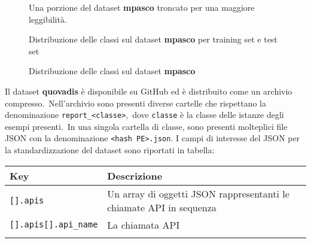 \begin{figure}[h!]
    \centering
    \inputminted[fontsize=\small]{text}{validazione-empirica/files/mpasco-example.csv}
    \caption{Una porzione del dataset \textbf{mpasco} troncato per una maggiore leggibilità.}
    \label{fig:mpasco-example}
\end{figure}


\begin{figure}[h!]
    \centering
    \caption{Distribuzione delle classi sul dataset \textbf{mpasco} per training set e test set}
    \label{fig:mpasco-classes-sets}
\end{figure}

\begin{figure}[h!]
    \centering
    \caption{Distribuzione delle classi sul dataset \textbf{mpasco}}
    \label{fig:mpasco-classes}
\end{figure}

\FloatBarrier


Il dataset \textbf{quovadis} è disponibile su GitHub ed è distribuito come un archivio compresso.\
Nell'archivio sono presenti diverse cartelle che rispettano la denominazione \texttt{report\_\textless classe\textgreater},\
dove \texttt{classe} è la classe delle istanze degli esempi presenti.\
In una singola cartella di classe, sono presenti molteplici file JSON con la denominazione \texttt{\textless hash PE\textgreater.json}.
I campi di interesse del JSON per la standardizzazione del dataset sono riportati in tabella:

\vspace{0.5cm} %

\begin{tabular}[H]{p{} p{}}
    \toprule
    \textbf{Key}                 & \textbf{Descrizione}                                                \\
    \midrule
    \texttt{[].apis}             & Un array di oggetti JSON rappresentanti le chiamate API in sequenza \\
    \texttt{[].apis[].api\_name} & La chiamata API                                                     \\
    \bottomrule
    \label{fig:quovadis-classes-sets}
\end{tabular}


